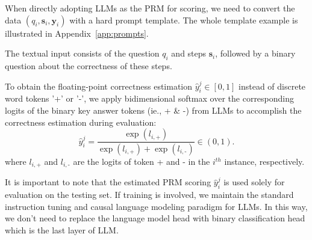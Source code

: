 When directly adopting LLMs as the PRM for scoring, we need to convert the data $(q_i,\mathbf{s}_i,\mathbf{y}_i)$ with a hard prompt template. The whole template example is illustrated in Appendix~\ref{app:prompts}.

The textual input consists of the question $q_i$ and steps $\mathbf{s}_i$, followed by a binary question about the correctness of these steps. 

To obtain the floating-point correctness estimation $\hat{y}_i^{j}\in[0,1]$ instead of discrete word tokens '+' or '-', we apply bidimensional softmax over the corresponding logits of the binary key answer tokens (ie., + \& -) from LLMs to accomplish the  correctness estimation during evaluation:
\begin{equation}
    \hat{y}_i^j=\frac{\exp(l_{i,\text{+}})}{\exp(l_{i,\text{+}})+\exp(l_{i,\text{-}})}\in(0,1).
\end{equation}
where $l_{i,\text{+}}$ and $l_{i,\text{-}}$ are the logits of token + and - in the  $i^{th}$ instance, respectively. 

It is important to note that the estimated PRM scoring $\hat{y}_i^j$ is used solely for evaluation on the testing set. If training is involved, we maintain the standard instruction tuning and causal language modeling paradigm for LLMs. In this way, we don't need to replace the language model head with binary classification head which is the last layer of LLM.

